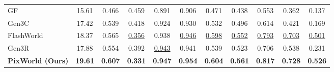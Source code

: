 \begin{table}[t]
{\begin{tabular}{l ccc cccc ccc}
GF~\citep{wu2025geometry}           & 15.61 & 0.466 & 0.459 & 0.891 & 0.906 & 0.471 & 0.438 & 0.553 & 0.362 & 0.137 \\
Gen3C~\citep{ren2025gen3c}          & 17.42 & 0.539 & 0.418 & 0.924 & 0.930 & 0.532 & 0.496 & 0.614 & 0.421 & 0.169 \\
FlashWorld~\citep{li2025flashworld} & 18.37 & 0.565 & \underline{0.356} & 0.938 & \underline{0.946} & \underline{0.598} & \underline{0.552} & \underline{0.793} & \underline{0.703} & \underline{0.501} \\
Gen3R~\citep{huang2026gen3r}        & 17.88 & 0.554 & 0.392 & \underline{0.943} & 0.941 & 0.539 & 0.523 & 0.706 & 0.538 & 0.231 \\
\rowcolor{cyan!8}
\textbf{PixWorld (Ours)}           & \textbf{19.61} & \textbf{0.607} & \textbf{0.331} & \textbf{0.947} & \textbf{0.954} & \textbf{0.604} & \textbf{0.561} & \textbf{0.817} & \textbf{0.728} & \textbf{0.526} \\
\bottomrule
\end{tabular}}
\end{table}